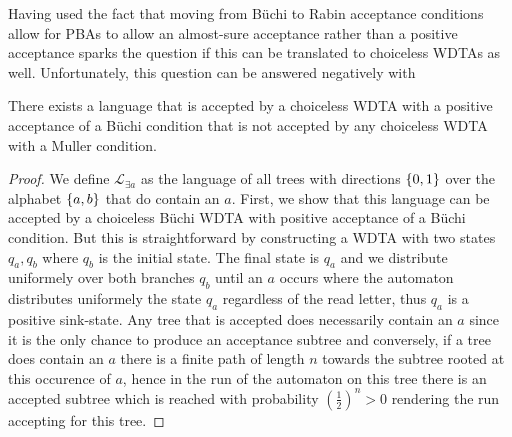Having used the fact that moving from Büchi to Rabin acceptance conditions
allow for \acp{PBA} to allow an almost-sure acceptance rather than a positive
acceptance sparks the question if this can be translated to choiceless
\acp{WDTA} as well. Unfortunately, this question can be answered negatively
with
\begin{proposition}
  There exists a language that is accepted by a choiceless \ac{WDTA} with a
  positive acceptance of a Büchi condition that is not accepted by any
  choiceless \ac{WDTA} with a Muller condition.
\end{proposition}
\begin{proof}
  We define $\mathcal{L}_{\exists a}$ as the language of all trees with
  directions $\left\{0,1\right\}$ over the alphabet $\left\{a,b\right\}$ that do contain an $a$.
  First, we show that this language can be accepted by a choiceless Büchi
  \ac{WDTA} with positive acceptance of a Büchi condition. But this is
  straightforward by constructing a \ac{WDTA} with two states $q_{a}, q_{b}$
  where $q_{b}$ is the initial state. The final state is $q_{a}$ and we
  distribute uniformely over both branches $q_{b}$ until an $a$ occurs where
  the automaton distributes uniformely the state $q_{a}$ regardless of the read
  letter, thus $q_{a}$ is a positive sink-state. Any tree that is accepted does
  necessarily contain an $a$ since it is the only chance to produce an
  acceptance subtree and conversely, if a tree does contain an $a$ there is a
  finite path of length $n$ towards the subtree rooted at this occurence of $a$,
  hence in the run of the automaton on this tree there is an accepted subtree
  which is reached with probability $(\frac{1}{2})^{n} > 0$ rendering the run
  accepting for this tree.


\end{proof}
